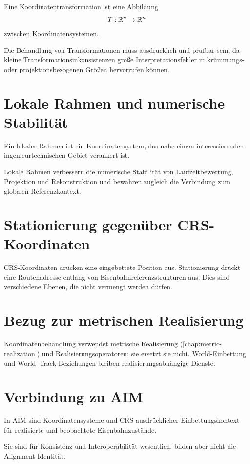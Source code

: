 \begin{definition}[Koordinatentransformation]
Eine Koordinatentransformation ist eine Abbildung
\[
T:\mathbb{R}^n\rightarrow\mathbb{R}^n
\]
zwischen Koordinatensystemen.
\end{definition}

Die Behandlung von Transformationen muss ausdrücklich und prüfbar sein, da
kleine Transformationsinkonsistenzen große Interpretationsfehler in
krümmungs- oder projektionsbezogenen Größen hervorrufen können.

\section{Lokale Rahmen und numerische Stabilität}

\begin{definition}
Ein lokaler Rahmen ist ein Koordinatensystem, das nahe einem interessierenden
ingenieurtechnischen Gebiet verankert ist.
\end{definition}

Lokale Rahmen verbessern die numerische Stabilität von Laufzeitbewertung,
Projektion und Rekonstruktion und bewahren zugleich die Verbindung zum globalen
Referenzkontext.

\section{Stationierung gegenüber CRS-Koordinaten}


CRS-Koordinaten drücken eine eingebettete Position aus. Stationierung drückt
eine Routenadresse entlang von Eisenbahnreferenzstrukturen aus. Dies sind
verschiedene Ebenen, die nicht vermengt werden dürfen.

\section{Bezug zur metrischen Realisierung}


Koordinatenbehandlung verwendet metrische Realisierung
(\cref{chap:metric-realization}) und Realisierungsoperatoren; sie ersetzt sie
nicht. World-Einbettung und World--Track-Beziehungen bleiben
realisierungsabhängige Dienste.

\section{Verbindung zu AIM}

\begin{summary}
In AIM sind Koordinatensysteme und CRS ausdrücklicher Einbettungskontext für
realisierte und beobachtete Eisenbahnzustände.

Sie sind für Konsistenz und Interoperabilität wesentlich, bilden aber nicht
die Alignment-Identität.
\end{summary}
